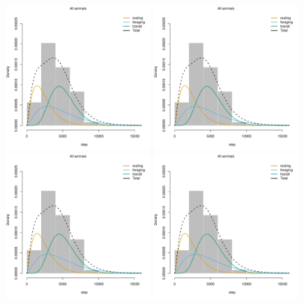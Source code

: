\documentclass[12pt]{article}\usepackage[]{graphicx}\usepackage[]{color}
\begin{document}
\begin{figure}[htbp]
  \includegraphics[width=0.49\textwidth,page=1]{plot_nfsResults}
  \includegraphics[width=0.49\textwidth,page=2]{plot_nfsResults}
  \includegraphics[width=0.49\textwidth,page=3]{plot_nfsResults}
  \includegraphics[width=0.49\textwidth,page=4]{plot_nfsResults}

\end{figure}
\end{document}
